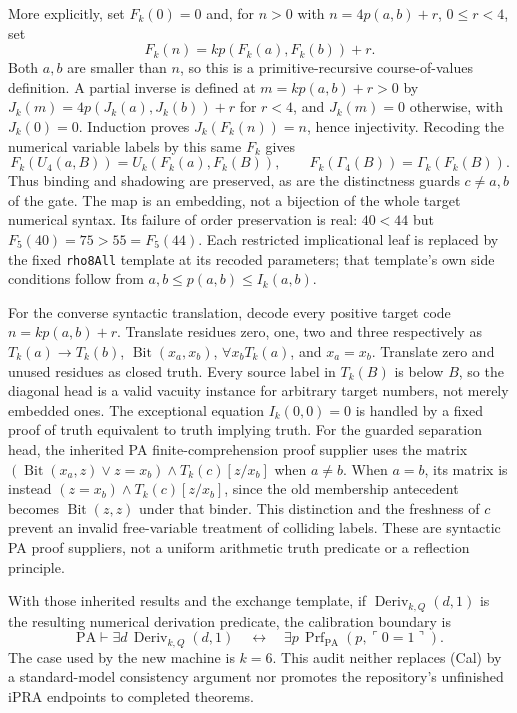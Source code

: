 More explicitly, set $F_k(0)=0$ and, for $n>0$ with
$n=4p(a,b)+r$, $0\leq r<4$, set
\[
                F_k(n)=kp(F_k(a),F_k(b))+r.
\]
Both $a,b$ are smaller than $n$, so this is a primitive-recursive
course-of-values definition.  A partial inverse is defined at
$m=kp(a,b)+r>0$ by
$J_k(m)=4p(J_k(a),J_k(b))+r$ for $r<4$, and $J_k(m)=0$ otherwise,
with $J_k(0)=0$.  Induction proves $J_k(F_k(n))=n$, hence injectivity.
Recoding the numerical variable labels by this same $F_k$ gives
\[
 F_k(U_4(a,B))=U_k(F_k(a),F_k(B)),\qquad
 F_k(\Gamma_4(B))=\Gamma_k(F_k(B)).
\]
Thus binding and shadowing are preserved, as are the distinctness guards
$c\ne a,b$ of the gate.  The map is an embedding, not a bijection of the
whole target numerical syntax.  Its failure of order preservation is real:
$40<44$ but $F_5(40)=75>55=F_5(44)$.  Each restricted implicational leaf
is replaced by the fixed \texttt{rho8All} template at its recoded parameters;
that template's own side conditions follow from
$a,b\leq p(a,b)\leq I_k(a,b)$.

For the converse syntactic translation, decode every positive target code
$n=kp(a,b)+r$.  Translate residues zero, one, two and three respectively
as $T_k(a)\to T_k(b)$, $\operatorname{Bit}(x_a,x_b)$,
$\forall x_b T_k(a)$, and $x_a=x_b$.  Translate zero and unused residues
as closed truth.  Every source label in $T_k(B)$ is below $B$, so the
diagonal head is a valid vacuity instance for arbitrary target numbers,
not merely embedded ones.  The exceptional equation $I_k(0,0)=0$ is
handled by a fixed proof of truth equivalent to truth implying truth.
For the guarded separation head, the inherited PA finite-comprehension
proof supplier uses the matrix
$(\operatorname{Bit}(x_a,z)\lor z=x_b)\land T_k(c)[z/x_b]$
when $a\ne b$.  When $a=b$, its matrix is instead
$(z=x_b)\land T_k(c)[z/x_b]$, since the old membership antecedent becomes
$\operatorname{Bit}(z,z)$ under that binder.  This distinction and the
freshness of $c$ prevent an invalid free-variable treatment of colliding
labels.  These are syntactic PA proof suppliers, not a uniform arithmetic
truth predicate or a reflection principle.

With those inherited results and the exchange template, if
$\operatorname{Deriv}_{k,Q}(d,1)$ is the resulting numerical derivation
predicate, the calibration boundary is
\[
 \mathrm{PA}\vdash
 \exists d\,\operatorname{Deriv}_{k,Q}(d,1)
 \quad\longleftrightarrow\quad
 \exists p\,\operatorname{Prf}_{\mathrm{PA}}(p,\ulcorner0=1\urcorner).
 \tag{Cal}
\]
The case used by the new machine is $k=6$.  This audit neither replaces
(Cal) by a standard-model consistency argument nor promotes the repository's
unfinished iPRA endpoints to completed theorems.

